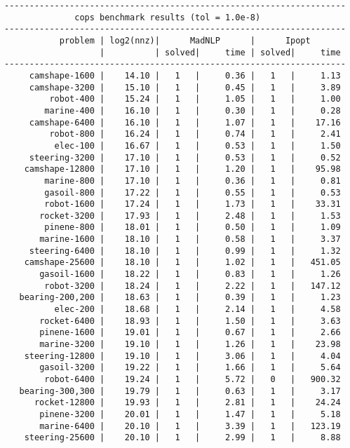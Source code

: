 \begin{lstlisting}
--------------------------------------------------------------------
              cops benchmark results (tol = 1.0e-8)
--------------------------------------------------------------------
           problem | log2(nnz)|      MadNLP      |      Ipopt        
                   |          | solved|     time | solved|     time     
--------------------------------------------------------------------
     camshape-1600 |    14.10 |   1   |     0.36 |   1   |     1.13
     camshape-3200 |    15.10 |   1   |     0.45 |   1   |     3.89
         robot-400 |    15.24 |   1   |     1.05 |   1   |     1.00
        marine-400 |    16.10 |   1   |     0.30 |   1   |     0.28
     camshape-6400 |    16.10 |   1   |     1.07 |   1   |    17.16
         robot-800 |    16.24 |   1   |     0.74 |   1   |     2.41
          elec-100 |    16.67 |   1   |     0.53 |   1   |     1.50
     steering-3200 |    17.10 |   1   |     0.53 |   1   |     0.52
    camshape-12800 |    17.10 |   1   |     1.20 |   1   |    95.98
        marine-800 |    17.10 |   1   |     0.36 |   1   |     0.81
        gasoil-800 |    17.22 |   1   |     0.55 |   1   |     0.53
        robot-1600 |    17.24 |   1   |     1.73 |   1   |    33.31
       rocket-3200 |    17.93 |   1   |     2.48 |   1   |     1.53
        pinene-800 |    18.01 |   1   |     0.50 |   1   |     1.09
       marine-1600 |    18.10 |   1   |     0.58 |   1   |     3.37
     steering-6400 |    18.10 |   1   |     0.99 |   1   |     1.32
    camshape-25600 |    18.10 |   1   |     1.02 |   1   |   451.05
       gasoil-1600 |    18.22 |   1   |     0.83 |   1   |     1.26
        robot-3200 |    18.24 |   1   |     2.22 |   1   |   147.12
   bearing-200,200 |    18.63 |   1   |     0.39 |   1   |     1.23
          elec-200 |    18.68 |   1   |     2.14 |   1   |     4.58
       rocket-6400 |    18.93 |   1   |     1.50 |   1   |     3.63
       pinene-1600 |    19.01 |   1   |     0.67 |   1   |     2.66
       marine-3200 |    19.10 |   1   |     1.26 |   1   |    23.98
    steering-12800 |    19.10 |   1   |     3.06 |   1   |     4.04
       gasoil-3200 |    19.22 |   1   |     1.66 |   1   |     5.64
        robot-6400 |    19.24 |   1   |     5.72 |   0   |   900.32
   bearing-300,300 |    19.79 |   1   |     0.63 |   1   |     3.17
      rocket-12800 |    19.93 |   1   |     2.81 |   1   |    24.24
       pinene-3200 |    20.01 |   1   |     1.47 |   1   |     5.18
       marine-6400 |    20.10 |   1   |     3.39 |   1   |   123.19
    steering-25600 |    20.10 |   1   |     2.99 |   1   |     8.88

\end{lstlisting}
